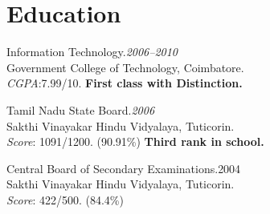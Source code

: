 \documentclass{cv}
\begin{document}
 

\section{Education}
\begin{description}[leftmargin=55pt,labelwidth=50pt]
  \item[B.Tech] Information Technology.\hfill\textit{2006--2010}
    \\Government College of Technology, Coimbatore.
    \\\textit{CGPA}:7.99/10.  \textbf{First class with Distinction.}
  \item[HSC] Tamil Nadu State Board.\hfill\textit{2006}
    \\Sakthi Vinayakar Hindu Vidyalaya, Tuticorin.
    \\\textit{Score}: 1091/1200. (90.91\%) \textbf{Third rank in school.}
  \item[AISSE] Central Board of Secondary Examinations.\hfill{2004}
    \\Sakthi Vinayakar Hindu Vidyalaya, Tuticorin.
    \\\textit{Score}: 422/500. (84.4\%)
\end{description}
 
\end{document}
